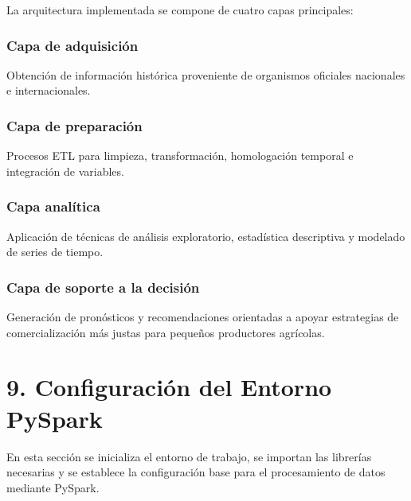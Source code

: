 \documentclass[11pt]{article}
\begin{document}
La arquitectura implementada se compone de cuatro capas principales:

\hypertarget{capa-de-adquisiciuxf3n}{%
\subsubsection{Capa de adquisición}\label{capa-de-adquisiciuxf3n}}

Obtención de información histórica proveniente de organismos oficiales
nacionales e internacionales.

\hypertarget{capa-de-preparaciuxf3n}{%
\subsubsection{Capa de preparación}\label{capa-de-preparaciuxf3n}}

Procesos ETL para limpieza, transformación, homologación temporal e
integración de variables.

\hypertarget{capa-analuxedtica}{%
\subsubsection{Capa analítica}\label{capa-analuxedtica}}

Aplicación de técnicas de análisis exploratorio, estadística descriptiva
y modelado de series de tiempo.

\hypertarget{capa-de-soporte-a-la-decisiuxf3n}{%
\subsubsection{Capa de soporte a la
decisión}\label{capa-de-soporte-a-la-decisiuxf3n}}

Generación de pronósticos y recomendaciones orientadas a apoyar
estrategias de comercialización más justas para pequeños productores
agrícolas.

    \hypertarget{configuraciuxf3n-del-entorno-pyspark}{%
\section{9. Configuración del Entorno
PySpark}\label{configuraciuxf3n-del-entorno-pyspark}}

En esta sección se inicializa el entorno de trabajo, se importan las
librerías necesarias y se establece la configuración base para el
procesamiento de datos mediante PySpark.
\end{document}
